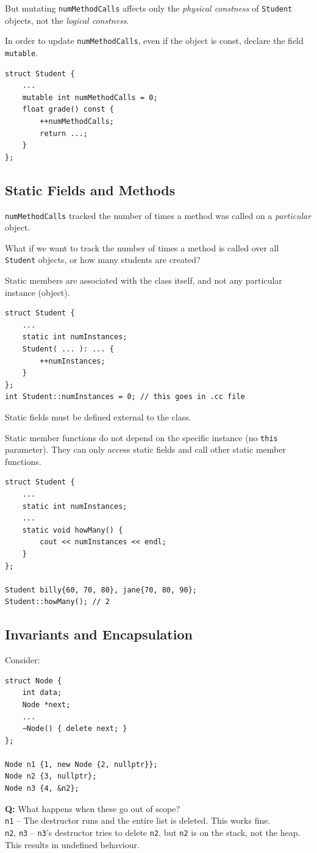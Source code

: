 \documentclass[11pt]{article}
\theoremstyle{definition}
\begin{document}
But mutating {\tt numMethodCalls} affects only the {\it physical constness} of {\tt Student} objects, not the {\it logical constness}.

In order to update {\tt numMethodCalls}, even if the object is const, declare the field {\tt mutable}.
\begin{lstlisting}
struct Student {
    ...
    mutable int numMethodCalls = 0;
    float grade() const { 
        ++numMethodCalls;
        return ...;
    }
};
\end{lstlisting}

\subsection{Static Fields and Methods}
{\tt numMethodCalls} tracked the number of times a method was called on a {\it particular} object.

What if we want to track the number of times a method is called over all {\tt Student} objects, or how many students are created?

Static members are associated with the class itself, and not any particular instance (object). 
\begin{lstlisting}
struct Student {
    ...
    static int numInstances;
    Student( ... ): ... { 
        ++numInstances;
    }
};
int Student::numInstances = 0; // this goes in .cc file
\end{lstlisting}
Static fields must be defined external to the class.

Static member functions do not depend on the specific instance (no {\tt this} parameter). They can only access static fields and call other static member functions.
\begin{lstlisting}
struct Student {
    ...
    static int numInstances;
    ...
    static void howMany() {
        cout << numInstances << endl;
    }
};

Student billy{60, 70, 80}, jane{70, 80, 90};
Student::howMany(); // 2
\end{lstlisting}

\subsection{Invariants and Encapsulation}
Consider:
\begin{lstlisting}
struct Node {
    int data;
    Node *next;
    ...
    ~Node() { delete next; }
};

Node n1 {1, new Node {2, nullptr}};
Node n2 {3, nullptr};
Node n3 {4, &n2};
\end{lstlisting}
{\bf Q:} What happens when these go out of scope? \\
{\tt n1} -- The destructor runs and the entire list is deleted. This works fine. \\
{\tt n2}, {\tt n3} -- {\tt n3}'s destructor tries to delete {\tt n2}, but {\tt n2} is on the stack, not the heap. This results in undefined behaviour.
\end{document}
